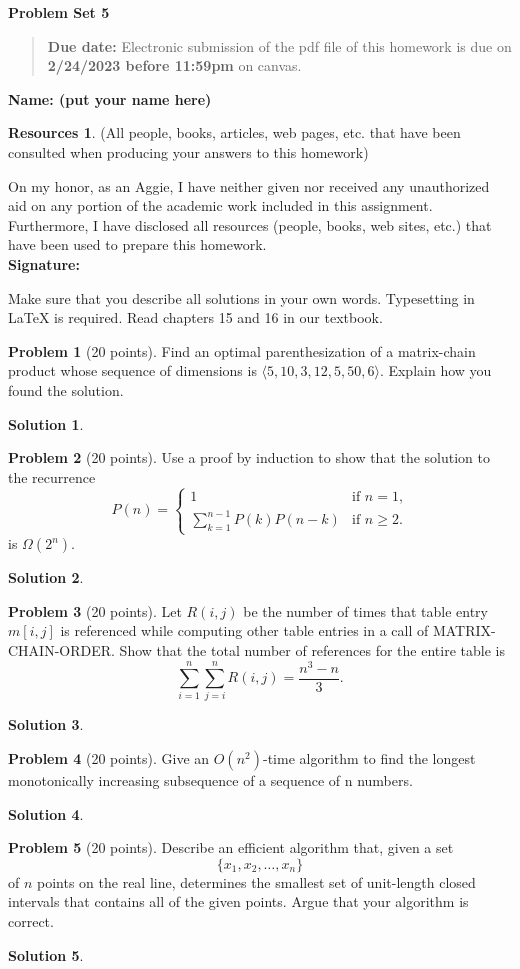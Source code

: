\documentclass{article}
\theoremstyle{definition}
\newtheorem{problem}{Problem}
\newtheorem*{solution}{Solution}
\newtheorem*{resources}{Resources}
\newcommand{\name}[1]{\noindent\textbf{Name: #1}}
\newcommand{\honor}{\noindent On my honor, as an Aggie, I have neither
  given nor received any unauthorized aid on any portion of the
  academic work included in this assignment. Furthermore, I have
  disclosed all resources (people, books, web sites, etc.) that have
  been used to prepare this homework. \\[1ex]
 \textbf{Signature:} \underline{\hspace*{5cm}} }
\newcommand{\problemset}[1]{\begin{center}\textbf{Problem Set
      #1}\end{center}}
\newcommand{\duedate}[1]{\begin{quote}\textbf{Due date:} Electronic
    submission of the pdf file of this homework is due on
    \textbf{#1} on canvas. \end{quote} }
\begin{document}
\problemset{5}
\duedate{2/24/2023 before 11:59pm}
\name{ (put your name here)}
\begin{resources} (All people, books, articles, web pages, etc. that
  have been consulted when producing your answers to this homework)
\end{resources}
\honor

\newpage
Make sure that you describe all solutions in your own
words. Typesetting in \LaTeX{} is required. Read
chapters 15 and 16 in our textbook. 

\begin{problem}[20 points]
  Find an optimal parenthesization of a matrix-chain product whose
  sequence of dimensions is $\langle 5, 10, 3, 12, 5, 50, 6\rangle$. 
  Explain how you found the solution.
\end{problem}
\begin{solution}
\end{solution}

\begin{problem}[20 points]
  Use a proof by induction to show that the solution to the
  recurrence
  $$ P(n) = 
  \begin{cases}
    1& \text{if $n=1$,} \\
    \sum_{k=1}^{n-1} P(k)P(n-k) & \text{if $n\ge 2$.}
  \end{cases}
  $$
    is $\Omega(2^n)$. 
\end{problem}
\begin{solution}
\end{solution}

\begin{problem}[20 points]
Let $R(i,j)$ be the number of times that table entry $m[i,j]$ is
referenced while computing other table entries in a call of
MATRIX-CHAIN-ORDER. Show that the total number of references for the
entire table is
$$ \sum_{i=1}^n\sum_{j=i}^n R(i,j) = \frac{n^3-n}{3}.$$
\end{problem}
\begin{solution}
\end{solution}

\begin{problem}[20 points]
  Give an $O(n^2)$-time algorithm to find the longest monotonically
  increasing subsequence of a sequence of n numbers.
\end{problem}
\begin{solution}
\end{solution}

\begin{problem}[20 points]
  Describe an efficient algorithm that, given a set
  $$\{ x_1, x_2, \ldots, x_n\}$$ of $n$ points on the real line,
  determines the smallest set of unit-length closed intervals that
  contains all of the given points. Argue that your algorithm is
  correct.
\end{problem}
\begin{solution}
\end{solution}
\end{document}
